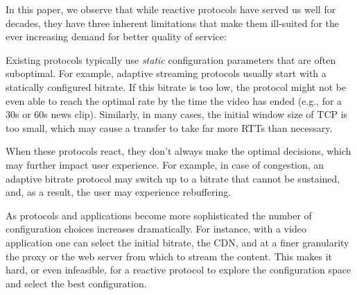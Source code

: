 In this paper, we observe that while reactive protocols have served us well for decades, 
they have three inherent limitations that make them ill-suited for the ever increasing demand for better quality of service: 

 Existing protocols typically use \emph{static} configuration parameters that are often suboptimal. For example, adaptive streaming protocols usually start with a statically configured bitrate. If this bitrate is too low, the protocol might not be even able to reach the optimal rate by the time the video has ended (e.g., for a 30s or 60s news clip). Similarly, in many cases, the initial window size of TCP is too small, which may cause a transfer to take far more RTTs than necessary. 

 When these protocols react, they don't always make the optimal decisions, which may further impact user experience. For example, in case of congestion, an adaptive bitrate protocol may switch up to a bitrate that cannot be sustained, and, as a result, the user may experience rebuffering.

 As protocols and applications become more sophisticated the number of configuration choices increases dramatically. For instance, with a video application one can select the initial bitrate, the CDN, and at a finer granularity the proxy or the web server from which to stream the content. This makes it hard, or even infeasible, for a reactive protocol to explore the configuration space and select the best configuration.



